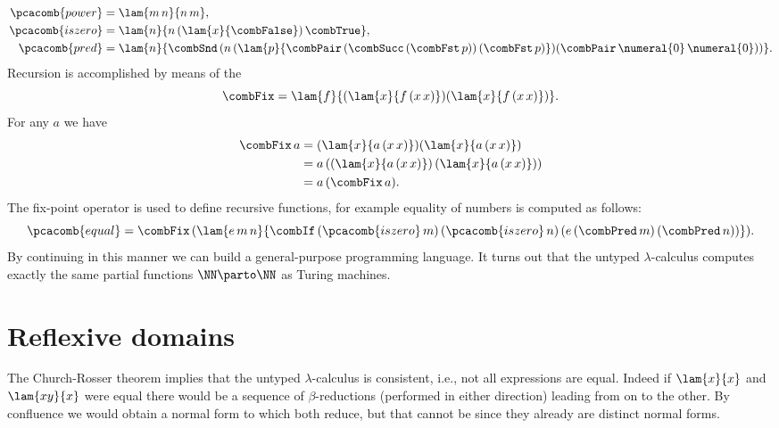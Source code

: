 %
\begin{align*}
  \pcacomb{power} &= \lam{m\,n}{n\,m},\\
  \pcacomb{iszero} &= \lam{n}{n\, (\lam{x}{\combFalse})\, \combTrue},\\
  \pcacomb{pred} &=
    \lam{n}{
      \combSnd\, (n\, (\lam{p}{
        \combPair\, (\combSucc\, (\combFst\, p))\,
        (\combFst\, p)})
      (\combPair\, \numeral{0}\, \numeral{0}))}.
\end{align*}
%
Recursion is accomplished by means of the 
%
\begin{equation*}
  \combFix = \lam{f}{(\lam{x}{f\,(x\,x)}) (\lam{x}{f\,(x\,x)})}.
\end{equation*}
%
For any $a$ we have
%
\begin{align*}
  \combFix\,a &=
  (\lam{x}{a\,(x\,x)}) (\lam{x}{a\,(x\,x)}) \\
  &= a\,((\lam{x}{a\,(x\,x)})\,(\lam{x}{a\,(x\,x)})) \\
  &= a\,(\combFix\,a).
\end{align*}
%
The fix-point operator is used to define recursive functions, for
example equality of numbers is computed as follows:
%
\begin{equation*}
  \pcacomb{equal} = \combFix\,(\lam{e\,m\,n}{
    \combIf\,
    (\pcacomb{iszero}\,m)\,
    (\pcacomb{iszero}\,n)\,
    (e\,(\combPred\,m)\,(\combPred\,n))}).
\end{equation*}
%
By continuing in this manner we can build a general-purpose programming language. It turns out that the untyped
$\lambda$-calculus computes exactly the same partial functions $\NN \parto \NN$ as Turing machines.


\section{Reflexive domains}
\label{sec:reflexive-domains}

The Church-Rosser theorem implies that the untyped $\lambda$-calculus
is consistent, i.e., not all expressions are equal. Indeed if $\lam{x}{x}$ and $\lam{x y}{x}$ were equal there would be a sequence of $\beta$-reductions (performed in either direction) leading from on to the other. By confluence we would obtain a normal form to which both reduce, but that cannot be since they already are distinct normal forms.

